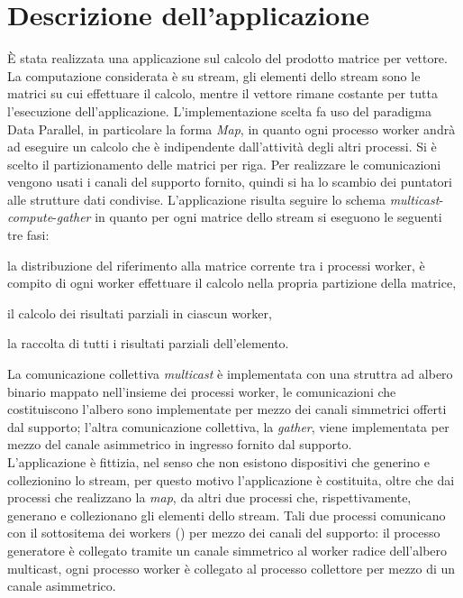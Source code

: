 \section{Descrizione dell'applicazione}
\`E stata realizzata una applicazione sul calcolo del prodotto matrice per vettore. La computazione considerata \`e su stream, gli elementi dello stream sono le matrici su cui effettuare il calcolo, mentre il vettore rimane costante per tutta l'esecuzione dell'applicazione. 
L'implementazione scelta fa uso del paradigma Data Parallel, in particolare la forma \emph{Map}, in quanto ogni processo worker andr\`a ad eseguire un calcolo che \`e indipendente dall'attivit\`a degli altri processi. Si \`e scelto il partizionamento delle matrici per riga. 
Per realizzare le comunicazioni vengono usati i canali del supporto fornito, quindi si ha lo scambio dei puntatori alle strutture dati condivise. L'applicazione risulta seguire lo schema \emph{multicast}-\emph{compute}-\emph{gather} in quanto per ogni matrice dello stream si eseguono le seguenti tre fasi: 
\begin{compactenum} 
\item la distribuzione del riferimento alla matrice corrente tra i processi worker, \`e compito di ogni worker effettuare il calcolo nella propria partizione della matrice, 
\item il calcolo dei risultati parziali in ciascun worker, 
\item la raccolta di tutti i risultati parziali dell'elemento.
\end{compactenum}
La comunicazione collettiva \emph{multicast} \`e implementata con una struttra ad albero binario mappato nell'insieme dei processi worker, le comunicazioni che costituiscono l'albero sono implementate per mezzo dei canali simmetrici offerti dal supporto; l'altra comunicazione collettiva, la \emph{gather}, viene implementata per mezzo del canale asimmetrico in ingresso fornito dal supporto. \\
L'applicazione \`e fittizia, nel senso che non esistono dispositivi che generino e collezionino lo stream, per questo motivo l'applicazione \`e costituita, oltre che dai processi che realizzano la \emph{map}, da altri due processi che, rispettivamente, generano e collezionano gli elementi dello stream. 
Tali due processi comunicano con il sottositema dei workers (\subsystem) per mezzo dei canali del supporto: il processo generatore \`e collegato tramite un canale simmetrico al worker radice dell'albero multicast, ogni processo worker \`e collegato al processo collettore per mezzo di un canale asimmetrico.


